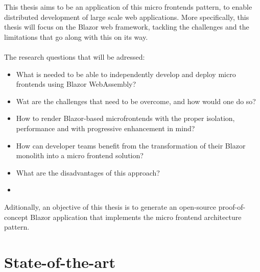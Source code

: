 This thesis aims to be an application of this micro frontends pattern, to enable
distributed development of large scale web applications. More specifically, this
thesis will focus on the Blazor web framework, tackling the challenges and the
limitations that go along with this on its way.\\\\\noindent
The research questions that will be adressed:
\begin{itemize}
    \item What is needed to be able to independently develop and deploy micro
    frontends using Blazor WebAssembly?
    \item Wat are the challenges that need to be overcome, and how would one do
    so? 
    \item How to render Blazor-based microfrontends with the proper isolation,
    performance and with progressive enhancement in mind?
    \item How can developer teams benefit from the transformation of their
    Blazor monolith into a micro frontend solution?
    \item What are the disadvantages of this approach?
    \item[]
\end{itemize}

\noindent Aditionally, an objective of this thesis is to generate an open-source
proof-of-concept Blazor application that implements the micro frontend
architecture pattern.

\section{State-of-the-art}
\label{sec:state-of-the-art}

%
% 

